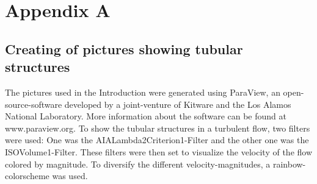 \documentclass[11pt,a4paper,openany,oneside,parskip=half*]{article}
\begin{document}
\section{Appendix A}
\subsection*{Creating of pictures showing tubular structures}
The pictures used in the Introduction were generated using ParaView, an open-source-software developed by a joint-venture of Kitware and the Los Alamos National Laboratory. More information about the software can be found at www.paraview.org. To show the tubular structures in a turbulent flow, two filters were used: One was the AIALambda2Criterion1-Filter and the other one was the ISOVolume1-Filter. These filters were then set to visualize the velocity of the flow colored by magnitude. To diversify the different velocity-magnitudes, a rainbow-colorscheme was used. 
\end{document}
